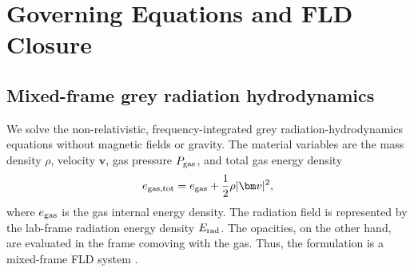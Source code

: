 
\section{Governing Equations and FLD Closure}
\label{sec:basic_equations}

\subsection{Mixed-frame grey radiation hydrodynamics}
\label{sec:rhd_equations}

We solve the non-relativistic, frequency-integrated grey
radiation-hydrodynamics equations without magnetic fields or gravity.  The
material variables are the mass density $\rho$, velocity $\bm v$, gas pressure
$P_{\rm gas}$, and total gas energy density
\begin{align}
    e_{\rm gas,tot}
    = e_{\rm gas}+\frac{1}{2}\rho |\bm v|^2,
    \label{eq:gas_total_energy_definition}
\end{align}
where $e_{\rm gas}$ is the gas internal energy density.  The radiation field
is represented by the lab-frame radiation energy density $E_{\rm rad}$.  The
opacities, on the other hand, are evaluated in the frame comoving with the
gas.  Thus, the formulation is a mixed-frame FLD system
\citep{Krumholz2007,Zhang2011}.

